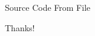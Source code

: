 \documentclass[hyperref, UTF8, CJK, aspectratio=169]{beamer}
\begin{document}
\begin{frame}[fragile]{Source Code From File}
\end{frame}


\begin{frame}
	\centering
	\Huge Thanks!
\end{frame}
\end{document}
